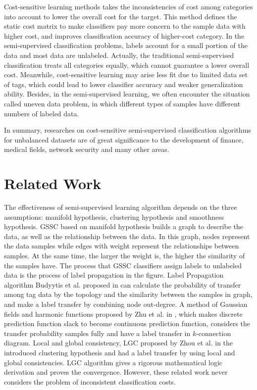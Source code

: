 \documentclass{svjour3}                     %
\begin{document}
Cost-sensitive learning methods \cite{gao2011active,elkan2001foundations,zhou2010multi,domingos1999metacost,fan1999adacost} takes the inconsistencies of cost among categories into account to lower the overall cost for the target. This method defines the static cost matrix to make classifiers pay more concern to the sample data with higher cost, and improves classification accuracy of higher-cost category. In the semi-supervised classification problems, labels account for a small portion of the data and most data are unlabeled. Actually, the traditional semi-supervised classification treats all categories equally, which cannot guarantee a lower overall cost. Meanwhile, cost-sensitive learning may arise less fit due to limited data set of tags, which could lead to lower classifier accuracy and weaker generalization ability. Besides, in the semi-supervised learning, we often encounter the situation called uneven data problem, in which different types of samples have different numbers of labeled data.

In summary, researches on cost-sensitive semi-supervised classification algorithms for unbalanced datasets are of great significance to the development of finance, medical fields, network security and many other areas.

\section{Related Work}
The effectiveness of semi-supervised learning algorithm depends on the three assumptions: manifold hypothesis\cite{urner2011access,zhou2010semi}, clustering hypothesis\cite{swarn2011cluster} and smoothness hypothesis. GSSC\cite{urner2011access} based on manifold hypothesis builds a graph to describe the data, as well as the relationship between the data. In this graph, nodes represent the data samples while edges with weight represent the relationships between samples. At the same time, the larger the weight is, the higher the similarity of the samples have. The process that GSSC classifiers assign labels to unlabeled data is the process of label propagation in the figure. Label Propagation algorithm Budyytis et al. proposed in \cite{budvytis2010label}  can calculate the probability of transfer among tag data by the topology and the similarity between the samples in graph, and make a label transfer by combining node out-degree. A method of Gaussian fields and harmonic functions proposed by Zhu et al. in \cite{zhu2003semi}, which makes discrete prediction function slack to become continuous prediction function, considers the transfer probability samples fully and have a label transfer in $k$-connection diagram. Local and global consistency, LGC proposed by Zhou et al. in the \cite{zhou2004learning} introduced clustering hypothesis and had a label transfer by using local and global consistencies. LGC algorithm gives a rigorous mathematical logic derivation and proves the convergence. However, these related work never considers the problem of inconsistent classification costs.
\end{document}
